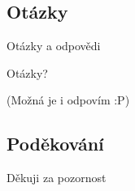\documentclass{beamer}
\begin{document}
\subsection{Otázky}
\begin{frame}{Otázky a odpovědi}
	\begin{center}Otázky?\end{center}
	\begin{center}(Možná je i odpovím :P)\end{center}
\end{frame}

\subsection{Poděkování}
\begin{frame}{}
	\begin{center}Děkuji za pozornost\end{center}
\end{frame}
\end{document}
